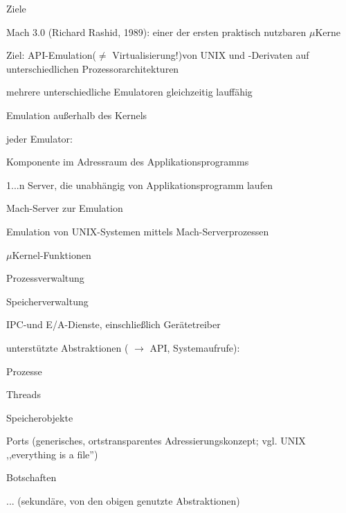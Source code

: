 \documentclass[a4paper]{article}
\begin{document}
\begin{multicols}{3}
    Ziele

    \begin{itemize*}
        \item
        Mach 3.0 (Richard Rashid, 1989): einer der ersten praktisch nutzbaren
        $\mu$Kerne
        \item
        Ziel: API-Emulation($\not =$ Virtualisierung!)von UNIX und -Derivaten auf
        unterschiedlichen Prozessorarchitekturen
        \item
        mehrere unterschiedliche Emulatoren gleichzeitig lauffähig
        \begin{itemize*}
            \item Emulation außerhalb des Kernels
            \item jeder Emulator: \begin{itemize*} \item Komponente im Adressraum des Applikationsprogramms \item 1...n Server, die unabhängig von Applikationsprogramm laufen \end{itemize*}
        \end{itemize*}
    \end{itemize*}

    Mach-Server zur Emulation

    \begin{itemize*}
        \item
        \item
        Emulation von UNIX-Systemen mittels Mach-Serverprozessen
    \end{itemize*}

    $\mu$Kernel-Funktionen

    \begin{enumerate*}
        \item
        Prozessverwaltung
        \item
        Speicherverwaltung
        \item
        IPC-und E/A-Dienste, einschließlich Gerätetreiber
    \end{enumerate*}

    unterstützte Abstraktionen ( $\rightarrow$ API,
    Systemaufrufe):

    \begin{enumerate*}
        \item
        Prozesse
        \item
        Threads
        \item
        Speicherobjekte
        \item
        Ports (generisches, ortstransparentes Adressierungskonzept; vgl. UNIX
        ,,everything is a file'')
        \item
        Botschaften
        \item
        ... (sekundäre, von den obigen genutzte Abstraktionen)
    \end{enumerate*}


\end{multicols}
\end{document}
